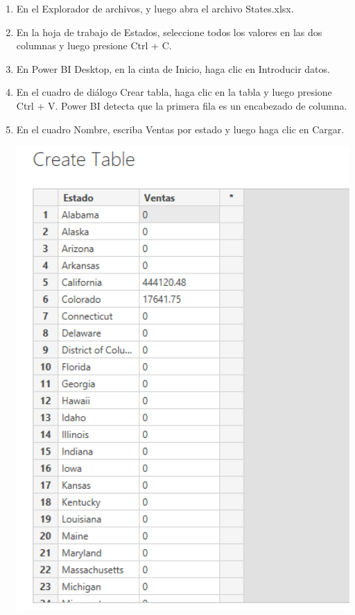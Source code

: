 \documentclass[12pt,letterpaper]{article}
\begin{document}
\begin{enumerate}
	\item En el Explorador de archivos, y luego abra el archivo States.xlsx.
	
    \item En la hoja de trabajo de Estados, seleccione todos los valores en las dos columnas y luego presione Ctrl + C.
    \item En Power BI Desktop, en la cinta de Inicio, haga clic en Introducir datos.
    \item  En el cuadro de diálogo Crear tabla, haga clic en la tabla y luego presione Ctrl + V. Power BI detecta que la primera fila es un encabezado de columna.
    


    \item En el cuadro Nombre, escriba Ventas por estado y luego haga clic en Cargar.
    
        \begin{center}
	\includegraphics[width=13cm]{./Imagenes/6}
	\end{center}
    

\end{enumerate}
\end{document}
